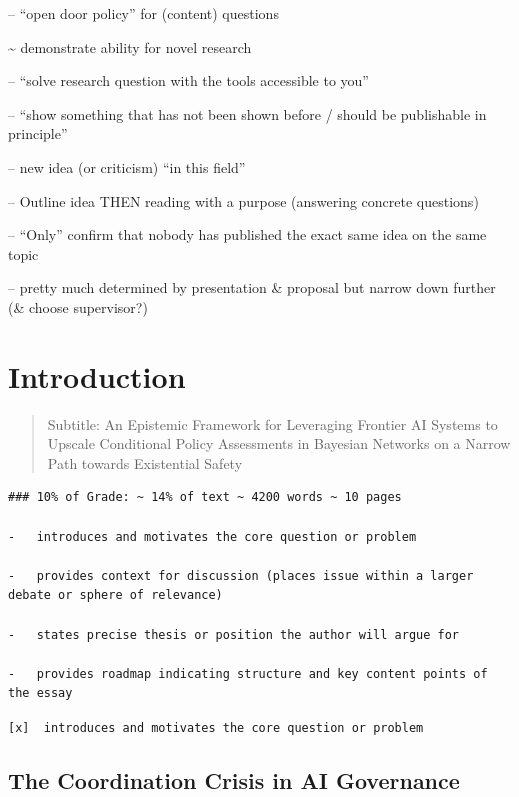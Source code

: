 \documentclass[
  11pt,
  letterpaper,
]{book}
\begin{document}
-- ``open door policy'' for (content) questions

\textasciitilde{} demonstrate ability for novel research

-- ``solve research question with the tools accessible to you''

-- ``show something that has not been shown before / should be
publishable in principle''

-- new idea (or criticism) ``in this field''

-- Outline idea THEN reading with a purpose (answering concrete
questions)

-- ``Only'' confirm that nobody has published the exact same idea on the
same topic

-- pretty much determined by presentation \& proposal but narrow down
further (\& choose supervisor?)


\chapter{Introduction}\label{sec-introduction}

\begin{quote}
Subtitle: An Epistemic Framework for Leveraging Frontier AI Systems to
Upscale Conditional Policy Assessments in Bayesian Networks on a Narrow
Path towards Existential Safety
\end{quote}

\begin{verbatim}
### 10% of Grade: ~ 14% of text ~ 4200 words ~ 10 pages

-   introduces and motivates the core question or problem

-   provides context for discussion (places issue within a larger debate or sphere of relevance)

-   states precise thesis or position the author will argue for

-   provides roadmap indicating structure and key content points of the essay
\end{verbatim}

\texttt{{[}x{]}\ \ introduces\ and\ motivates\ the\ core\ question\ or\ problem}

\section{The Coordination Crisis in AI
Governance}\label{sec-coordination-crisis}
\end{document}
